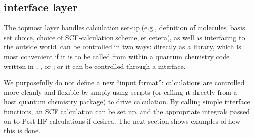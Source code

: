 %
%
%

%
%
\subsection{\molsturm interface layer}


The topmost \molsturm layer handles calculation set-up 
(e.g., definition of molecules, basis set choice, choice 
of SCF-calculation scheme, et cetera), as well as interfacing 
to the outside world. \molsturm can be controlled in two ways: 
directly as a \cpp library, which is most convenient if it is to 
be called from within a quantum chemistry code written in \cee, \cpp, 
or \fortran; or it can be controlled through a \python interface.

We purposefully do not define a new ``input format'': calculations are 
controlled more cleanly and flexible by simply using
\python scripts (or calling it directly from a host quantum 
chemistry package) to drive calculation.
By calling simple interface functions, an SCF calculation can be set
up, and the appropriate integrals passed on to Post-HF calculations
if desired. The next section shows examples of how this is done.

